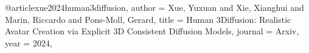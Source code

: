 @article{xue2024human3diffusion,
  author    = {Xue, Yuxuan and Xie, Xianghui and Marin, Riccardo and Pons-Moll, Gerard},
  title     = {Human 3Diffusion: Realistic Avatar Creation via Explicit 3D Consistent Diffusion Models},
  journal   = {Arxiv},
  year      = {2024},
}